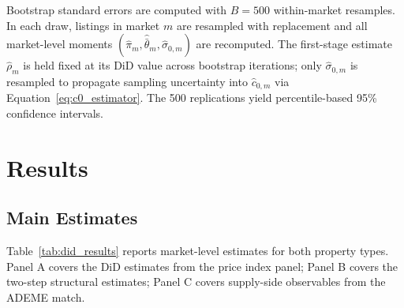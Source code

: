 \documentclass[10pt,letterpaper]{bp-template-concise}
\begin{document}
Bootstrap standard errors are computed with $B=500$ within-market resamples. In each draw, listings in market $m$ are resampled with replacement and all market-level moments $(\hat\pi_m, \hat{\bar\theta}_m, \hat\sigma_{0,m})$ are recomputed. The first-stage estimate $\hat\rho_m$ is held fixed at its DiD value across bootstrap iterations; only $\hat\sigma_{0,m}$ is resampled to propagate sampling uncertainty into $\hat{c}_{0,m}$ via Equation~\eqref{eq:c0_estimator}. The 500 replications yield percentile-based 95\% confidence intervals.

\section{Results}
\label{sec:results}

\subsection{Main Estimates}

Table~\ref{tab:did_results} reports market-level estimates for both property types. Panel A covers the DiD estimates from the price index panel; Panel B covers the two-step structural estimates; Panel C covers supply-side observables from the ADEME match.
\end{document}
